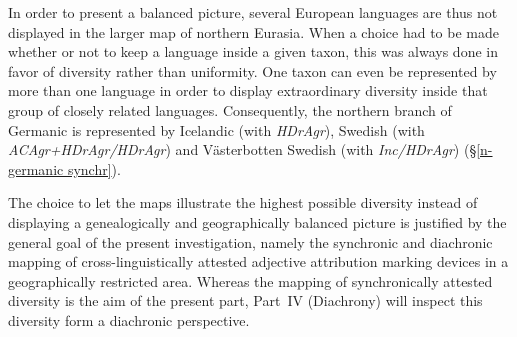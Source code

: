 In order to present a balanced picture, several European languages are thus not displayed in the larger map of northern Eurasia. When a choice had to be made whether or not to keep a language inside a given taxon, this was always done in favor of diversity rather than uniformity. One taxon can even be represented by more than one language in order to display extraordinary diversity inside that group of closely related languages. Consequently, the northern branch of Germanic is represented by Icelandic (with \textit{HDrAgr}), Swedish (with \textit{ACAgr+HDrAgr/HDrAgr}) and Västerbotten Swedish (with \textit{Inc/HDrAgr}) (\S\ref{n-germanic synchr}).

The choice to let the maps illustrate the highest possible diversity instead of displaying a genealogically and geographically balanced picture is justified by the general goal of the present investigation, namely the synchronic and diachronic mapping of cross-linguistically attested adjective attribution marking devices in a geographically restricted area. Whereas the mapping of synchronically attested diversity is the aim of the present part, Part~IV (Diachrony) will inspect this diversity form a diachronic perspective.
